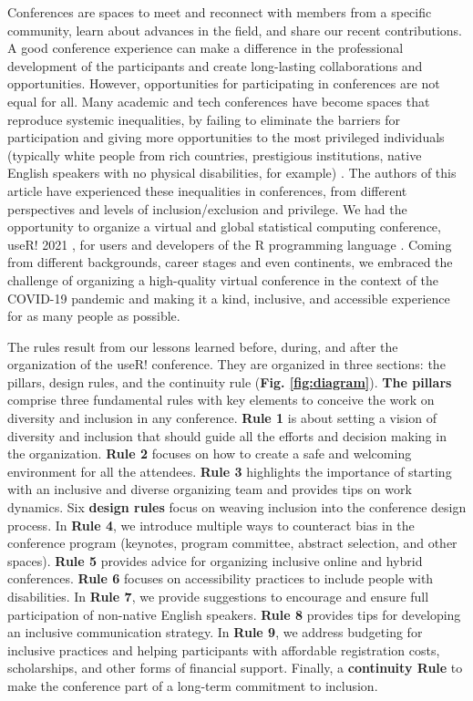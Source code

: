 \documentclass[10pt,letterpaper]{article}
\begin{document}
Conferences are spaces to meet and reconnect with members from a specific community, learn about advances in the field, and share our recent contributions.
A good conference experience can make a difference in the professional development of the participants and create long-lasting collaborations and opportunities. 
However, opportunities for participating in conferences are not equal for all. 
Many academic and tech conferences have become spaces that reproduce systemic inequalities, by failing to eliminate the barriers for participation and giving more opportunities to the most privileged individuals (typically white people from rich countries, prestigious institutions, native English speakers with no physical disabilities, for example) \cite{arendDisparityConferenceRegistration2019, biggsAcademicConferenceChilly2018, depickerRethinkingInclusionDisability2020a, irishIncreasingParticipationUsing2020}.
The authors of this article have experienced these inequalities in conferences, from different perspectives and levels of inclusion/exclusion and privilege.
We had the opportunity to organize a virtual and global statistical computing conference, useR! 2021 \cite{sanchez-tapia_user_2021-2}, for users and developers of the R programming language \cite{r_core_team_2021}.
Coming from different backgrounds, career stages and even continents, we embraced the challenge of organizing a high-quality virtual conference in the context of the COVID-19 pandemic and making it a kind, inclusive, and accessible experience for as many people as possible.

The rules result from our lessons learned before, during, and after the organization of the useR! conference. 
They are organized in three sections: the pillars, design rules, and the continuity rule (\textbf{Fig. \ref{fig:diagram}}).
\textbf{The pillars} comprise three fundamental rules with key elements to conceive the work on diversity and inclusion in any conference. 
\textbf{Rule 1} is about setting a vision of diversity and inclusion that should guide all the efforts and decision making in the organization.
\textbf{Rule 2} focuses on how to create a safe and welcoming environment for all the attendees. 
\textbf{Rule 3} highlights the importance of starting with an inclusive and diverse organizing team and provides tips on work dynamics.
Six \textbf{design rules} focus on weaving inclusion into the conference design process.
In \textbf{Rule 4}, we introduce multiple ways to counteract bias in the conference program (keynotes, program committee, abstract selection, and other spaces). 
\textbf{Rule 5} provides advice for organizing inclusive online and hybrid conferences.
\textbf{Rule 6} focuses on accessibility practices to include people with disabilities. 
In \textbf{Rule 7}, we provide suggestions to encourage and ensure full participation of non-native English speakers. 
\textbf{Rule 8} provides tips for developing an inclusive communication strategy. 
In \textbf{Rule 9}, we address budgeting for inclusive practices and helping participants with affordable registration costs, scholarships, and other forms of financial support.
Finally, 
a \textbf{continuity Rule} to make the conference part of a long-term commitment to inclusion. 
\end{document}
